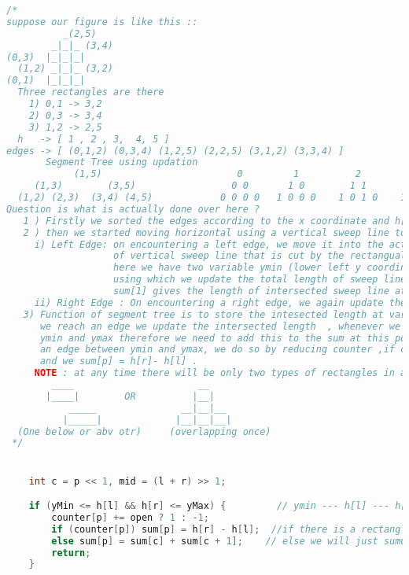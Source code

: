 \documentclass[12pt,a4paper, twoside]{report}
\begin{document}
\begin{lstlisting}[caption=Área da união de retângulos (N log N) - Outra implementação,language=C++]
 /*
suppose our figure is like this ::
          _(2,5)
        _|_|_ (3,4)
(0,3)  |_|_|_|
  (1,2) _|_|_ (3,2)
(0,1)  |_|_|_|
  Three rectangles are there
    1) 0,1 -> 3,2
    2) 0,3 -> 3,4
    3) 1,2 -> 2,5
  h   -> [ 1 , 2 , 3,  4, 5 ]
edges -> [ (0,1,2) (0,3,4) (1,2,5) (2,2,5) (3,1,2) (3,3,4) ]
       Segment Tree using updation
            (1,5)                        0         1          2          4          2         1         0
     (1,3)        (3,5)                 0 0       1 0        1 1        2 2        1 1       0 1       0 0
  (1,2) (2,3)  (3,4) (4,5)            0 0 0 0   1 0 0 0    1 0 1 0    1 1 1 0    1 0 1 0   0 0 1 0   0 0 0 0
Question is what is actually done over here ?
   1 ) Firstly we sorted the edges according to the x coordinate and h[] according to y coordinates.
   2 ) then we started moving horizontal using a vertical sweep line to encounter 2  types of events : Left Edge,  Right Edge
     i) Left Edge: on encountering a left edge, we move it into the active sets and update the total length
                   of vertical sweep line that is cut by the rectangualar boxes , this is done by update function
                   here we have two variable ymin (lower left y coordinate), ymax (upper left y coordinate) .
                   using which we update the total length of sweep line intersected at that event, and after updating
                   sum[1] gives the length of intersected sweep line at that x coordinate.
     ii) Right Edge : On encountering a right edge, we again update the segment tree.
   3) Function of segment tree is to store the intesected length at various x positions namely the events, whenever
      we reach an edge we update the intersected length  , whenever we are at left edge we know that we have added an edge between
      ymin and ymax therefore we need to add this to the sum at this position, if we are at right edge we know that we need to remove
      an edge between ymin and ymax, we do so by reducing counter ,if counter is still not zero means there were overlapping rectss
      and we sum[p] = h[r]- h[l] .
     NOTE : at any time there will be only two types of rectangles in active sets we need to worry abt
        ____                      __
       |____|        OR          |__|
           _____               __|__|__
          |_____|             |__|__|__|
  (One below or abv otr)     (overlapping once)
 */


    int c = p << 1, mid = (l + r) >> 1;

    if (yMin <= h[l] && h[r] <= yMax) {         // ymin --- h[l] --- h[r] --- ymax
        counter[p] += open ? 1 : -1;
        if (counter[p]) sum[p] = h[r] - h[l];  //if there is a rectangle at that posn that is bw h[l] and h[r] we will add that to length
        else sum[p] = sum[c] + sum[c + 1];    // else we will just sumup of lengths above and beloew this region
        return;
    }


\end{lstlisting}
\end{document}
